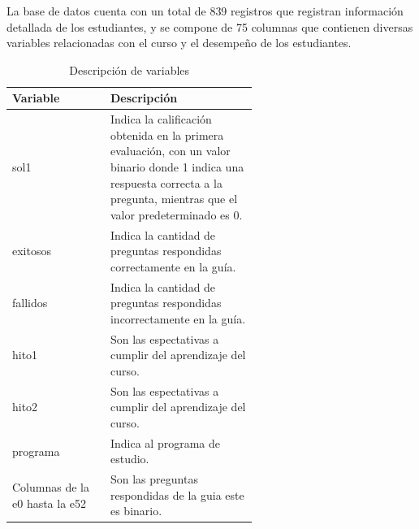 La base de datos cuenta con un total de 839 registros que registran información detallada de los 
estudiantes, y se compone de 75 columnas que contienen diversas variables relacionadas con el curso 
y el desempeño de los estudiantes.

\begin{table}[htbp]
  \centering
  \caption{Descripción de variables}
  \begin{tabular}{|l|p{0.6\linewidth}|}
    \hline
    \textbf{Variable}              & \textbf{Descripción}                                                                                                                                                               \\
    \hline
    sol1                           & Indica la calificación obtenida en la primera evaluación, con un valor binario donde 1 indica una respuesta correcta a la pregunta, mientras que el valor predeterminado es 0. \\
    \hline
    exitosos                       & Indica la cantidad de preguntas respondidas correctamente en la guía.                                                                                                          \\
    \hline
    fallidos                       & Indica la cantidad de preguntas respondidas incorrectamente en la guía.                                                                                                        \\
    \hline
    hito1                          & Son las espectativas a cumplir del aprendizaje del curso.                                                                                                                          \\
    \hline
    hito2                          & Son las espectativas a cumplir del aprendizaje del curso.                                                                                                                          \\
    \hline
    programa                       & Indica al programa de estudio.                                                                                                                                                 \\
    \hline
    Columnas de la e0 hasta la e52 & Son las preguntas respondidas de la guia este es binario.                                                                                                                          \\
    \hline
  \end{tabular}
  \label{tab:variables}
\end{table}


